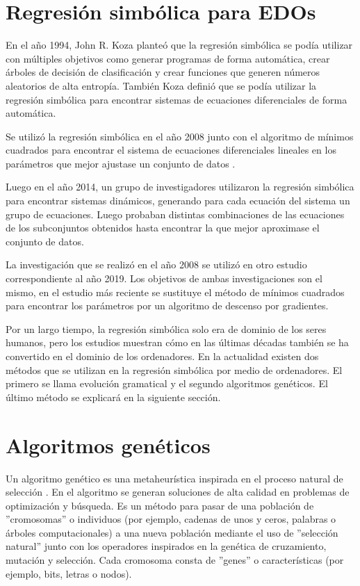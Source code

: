 \section{Regresión simbólica para EDOs}

En el año 1994, John R. Koza planteó que la regresión simbólica se podía utilizar con múltiples objetivos como generar programas de forma automática, crear árboles de decisión de clasificación y crear funciones que generen números aleatorios de alta entropía. También Koza definió que se podía utilizar la regresión simbólica para encontrar sistemas de ecuaciones diferenciales de forma automática.\cite{koza1994genetic}

Se utilizó la regresión simbólica en el año 2008 junto con el algoritmo de mínimos cuadrados para encontrar el sistema de ecuaciones diferenciales lineales en los parámetros que mejor ajustase un conjunto de datos \cite{iba2008inference}.

Luego en el año 2014, un grupo de investigadores utilizaron la regresión simbólica para encontrar sistemas dinámicos, generando para cada ecuación del sistema un grupo de ecuaciones. Luego probaban distintas combinaciones de las ecuaciones de los subconjuntos obtenidos hasta encontrar la que mejor aproximase el conjunto de datos. \cite{gaucel2014learning}

La investigación que se realizó en el año 2008 se utilizó en otro estudio correspondiente al año 2019. Los objetivos de ambas investigaciones son el mismo, en el estudio más reciente se sustituye el método de mínimos cuadrados para encontrar los parámetros por un algoritmo de descenso por gradientes. \cite{kronberger2019identification}

Por un largo tiempo, la regresión simbólica solo era de dominio de los seres humanos, pero los estudios muestran cómo en las últimas décadas también se ha convertido en el dominio de los ordenadores. En la actualidad existen dos métodos que se utilizan en la regresión simbólica por medio de ordenadores. El primero se llama evolución gramatical y el segundo algoritmos genéticos. \cite{zelinka2005analytic} El último método se explicará en la siguiente sección.

\section{Algoritmos genéticos}

Un algoritmo genético es una metaheurística inspirada en el proceso natural de selección \cite{mitchell1998introduction}. En el algoritmo se generan soluciones de alta calidad en problemas de optimización y búsqueda. Es un método para pasar de una población de ''cromosomas'' o individuos (por ejemplo, cadenas de unos y ceros, palabras o árboles computacionales) a una nueva población mediante el uso de ''selección natural'' junto con los operadores inspirados en la genética de cruzamiento, mutación y selección. Cada cromosoma consta de ''genes'' o características (por ejemplo, bits, letras o nodos).

